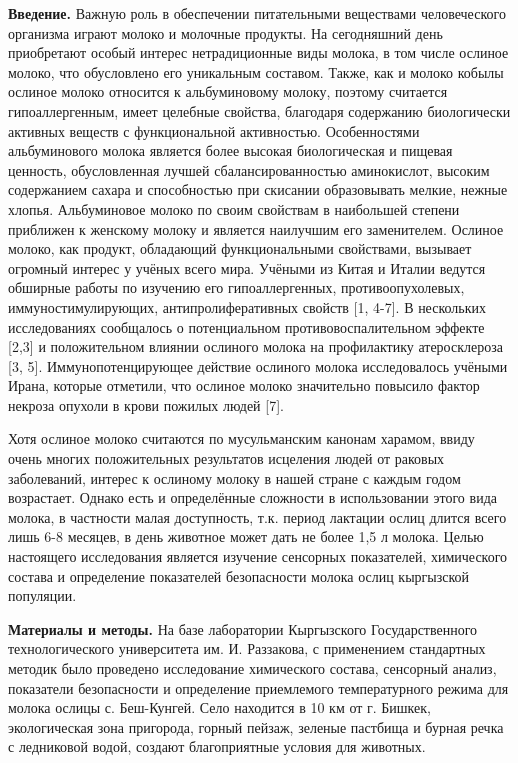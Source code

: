 \begin{multicols}{2}
{\bfseries Введение.} Важную роль в обеспечении питательными веществами
человеческого организма играют молоко и молочные продукты. На
сегодняшний день приобретают особый интерес нетрадиционные виды молока,
в том числе ослиное молоко, что обусловлено его уникальным составом.
Также, как и молоко кобылы ослиное молоко относится к альбуминовому
молоку, поэтому считается гипоаллергенным, имеет целебные свойства,
благодаря содержанию биологически активных веществ с функциональной
активностью. Особенностями альбуминового молока является более высокая
биологическая и пищевая ценность, обусловленная лучшей
сбалансированностью аминокислот, высоким содержанием сахара и
способностью при скисании образовывать мелкие, нежные хлопья.
Альбуминовое молоко по своим свойствам в наибольшей степени приближен к
женскому молоку и является наилучшим его заменителем. Ослиное молоко,
как продукт, обладающий функциональными свойствами, вызывает огромный
интерес у учёных всего мира. Учёными из Китая и Италии ведутся обширные
работы по изучению его гипоаллергенных, противоопухолевых,
иммуностимулирующих, антипролиферативных свойств {[}1, 4-7{]}. В
нескольких исследованиях сообщалось о потенциальном
противовоспалительном эффекте {[}2,3{]} и положительном влиянии ослиного
молока на профилактику атеросклероза {[}3, 5{]}. Иммунопотенцирующее
действие ослиного молока исследовалось учёными Ирана, которые отметили,
что ослиное молоко значительно повысило фактор некроза опухоли в крови
пожилых людей {[}7{]}.

Хотя ослиное молоко считаются по мусульманским канонам харамом, ввиду
очень многих положительных результатов исцеления людей от раковых
заболеваний, интерес к ослиному молоку в нашей стране с каждым годом
возрастает. Однако есть и определённые сложности в использовании этого
вида молока, в частности малая доступность, т.к. период лактации ослиц
длится всего лишь 6-8 месяцев, в день животное может дать не более 1,5 л
молока. Целью настоящего исследования является изучение сенсорных
показателей, химического состава и определение показателей безопасности
молока ослиц кыргызской популяции.

{\bfseries Материалы и методы.} На базе лаборатории Кыргызского
Государственного технологического университета им. И. Раззакова, с
применением стандартных методик было проведено исследование химического
состава, сенсорный анализ, показатели безопасности и определение
приемлемого температурного режима для молока ослицы с. Беш-Кунгей. Село
находится в 10 км от г. Бишкек, экологическая зона пригорода, горный
пейзаж, зеленые пастбища и бурная речка с ледниковой водой, создают
благоприятные условия для животных.


\end{multicols}
